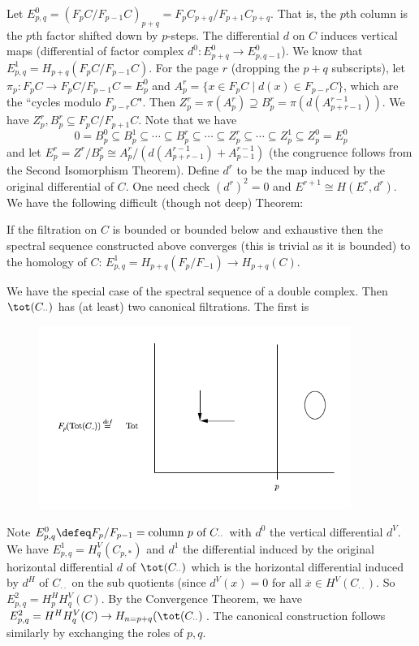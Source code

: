 Let $E^0_{p,q}=(F_pC/F_{p-1}C)_{p+q}=F_pC_{p+q}/F_{p+1}C_{p+q}$. That is, the $p$th column is the $p$th factor shifted down by $p$-steps. The differential $d$ on $C$ induces vertical maps (differential of factor complex $d^0: E^0_{p+q} \to E^0_{p,q-1}$). We know that $E^1_{p,q}=H_{p+q}(F_pC/F_{p-1}C)$. For the page $r$ (dropping the $p+q$ subscripts), let $\pi_p: F_pC \to F_pC/F_{p-1}C=E_p^0$ and $A^r_p=\{x \in F_pC \;|\; d(x) \in F_{p-r}C \}$, which are the ``cycles modulo $F_{p-r}C$". Then $Z_p^r=\pi(A_p^r) \supseteq B_p^r=\pi(d(A^{r-1}_{p+r-1}))$. We have $Z_p^r,B_p^r \subseteq F_pC/F_{p+1}C$. Note that we have
\[
0=B^0_p \subseteq B_p^1 \subseteq \cdots \subseteq B_p^r \subseteq \cdots \subseteq Z_p^r \subseteq \cdots \subseteq Z_p^1 \subseteq Z_p^0=E_p^0
\]
and let $E^r_p=Z^r/B_p^r \cong A^r_p/\left(d(A^{r-1}_{p+r-1})+A^{r-1}_{p-1}\right)$ (the congruence follows from the Second Isomorphism Theorem). Define $d^r$ to be the map induced by the original differential of $C$. One need check $(d^r)^2=0$ and $E^{r+1} \cong H(E^r,d^r)$. We have the following difficult (though not deep) Theorem:

\begin{thm}
If the filtration on $C$ is bounded or bounded below and exhaustive then the spectral sequence constructed above converges (this is trivial as it is bounded) to the homology of $C$: $E_{p,q}^1=H_{p+q}(F_p/F_{-1}) \to H_{p+q}(C)$. 
\end{thm}

We have the special case of the spectral sequence of a double complex. Then $\tot(C_{\cdot \cdot})$ has (at least) two canonical filtrations. The first is
\begin{figure}[h] 
   \centering
   \includegraphics[width=4in]{images/almostfinal.png} 
\end{figure}
Note $E^0_{p,q} \defeq F_p/F_{p-1}= \text{column }p \text{ of } C_{\cdot \cdot}$ with $d^0$ the vertical differential $d^V$. We have $E^1_{p,q}=H^V_q(C_{p,*})$ and $d^1$ the differential induced by the original horizontal differential $d$ of $\tot(C_{\cdot \cdot})$ which is the horizontal differential induced by $d^H$ of $C_{\cdot \cdot}$ on the sub quotients (since $d^V(x)=0$ for all $\overline{x} \in H^V(C_{\cdot \cdot})$. So $E^2_{p,q}=H^H_pH^V_q(C)$. By the Convergence Theorem, we have $E^2_{p,q}=H^H H^V_q(C) \to H_{n=p+q}(\tot(C_{\cdot \cdot})$. The canonical construction follows similarly by exchanging the roles of $p,q$. 

